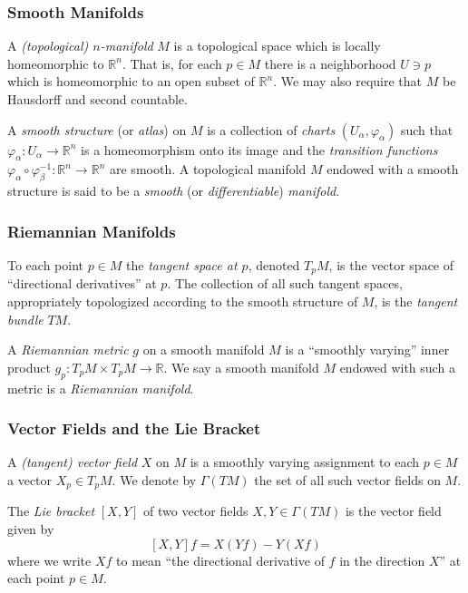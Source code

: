 \documentclass{beamer}
\newcommand{\R}{\mathbb{R}}
\theoremstyle{definition}
\begin{document}
\begin{frame}
    \frametitle{Smooth Manifolds}

    \begin{definition}
        A \emph{(topological) $n$-manifold} $M$ is a topological space which is
        locally homeomorphic to $\R^n$. That is, for each $p \in M$ there is
        a neighborhood $U \ni p$ which is homeomorphic to an open subset of $\R^n$.
        We may also require that $M$ be Hausdorff and second countable.
    \end{definition}
    \begin{definition}
        A \emph{smooth structure} (or \emph{atlas}) on $M$ is a collection
        of \emph{charts} $(U_\alpha, \varphi_\alpha)$ such that
        $\varphi_\alpha : U_\alpha \to \R^n$ is a homeomorphism onto its image
        and the \emph{transition functions}
        $\varphi_\alpha \circ \varphi_\beta^{-1} : \R^n \to \R^n$
        are smooth. A topological manifold $M$ endowed with a smooth structure is
        said to be a \emph{smooth} (or \emph{differentiable}) \emph{manifold}.
    \end{definition}
\end{frame}

\begin{frame}
    \frametitle{Riemannian Manifolds}

    \begin{definition}
        To each point $p \in M$ the \emph{tangent space at $p$}, denoted $T_pM$,
        is the vector space of ``directional derivatives'' at $p$. The collection
        of all such tangent spaces, appropriately topologized according to the
        smooth structure of $M$, is the \emph{tangent bundle} $TM$.
    \end{definition}
    \begin{definition}
        A \emph{Riemannian metric} $g$ on a smooth manifold $M$ is a ``smoothly varying''
        inner product $g_p : T_pM \times T_pM \to \R$.
        We say a smooth manifold $M$ endowed with such a metric is a \emph{Riemannian manifold}.
    \end{definition}
\end{frame}

\begin{frame}
    \frametitle{Vector Fields and the Lie Bracket}

    \begin{definition}
        A \emph{(tangent) vector field} $X$ on $M$ is a smoothly varying assignment
        to each $p \in M$ a vector $X_p \in T_pM$. We denote by $\Gamma(TM)$ the
        set of all such vector fields on $M$.
    \end{definition}

    \begin{definition}
        The \emph{Lie bracket} $[X,Y]$ of two vector fields $X, Y \in \Gamma(TM)$
        is the vector field given by
        \[
          [X,Y]f = X(Yf) - Y(Xf)  
        \]
        where we write $Xf$ to mean ``the directional derivative of $f$ in the direction $X$''
        at each point $p \in M$.
    \end{definition}

\end{frame}
\end{document}
